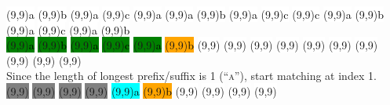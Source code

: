 \begin{center}
  \colorbox{white}{\makebox(9,9){\textcolor{black}{a}}}
  \colorbox{white}{\makebox(9,9){\textcolor{black}{b}}}
  \colorbox{white}{\makebox(9,9){\textcolor{black}{a}}}
  \colorbox{white}{\makebox(9,9){\textcolor{black}{c}}}
  \colorbox{white}{\makebox(9,9){\textcolor{black}{a}}}
  \colorbox{white}{\makebox(9,9){\textcolor{black}{a}}}
  \colorbox{white}{\makebox(9,9){\textcolor{black}{b}}}
  \colorbox{white}{\makebox(9,9){\textcolor{black}{a}}}
  \colorbox{white}{\makebox(9,9){\textcolor{black}{c}}}
  \colorbox{white}{\makebox(9,9){\textcolor{black}{c}}}
  \colorbox{white}{\makebox(9,9){\textcolor{black}{a}}}
  \colorbox{white}{\makebox(9,9){\textcolor{black}{b}}}
  \colorbox{white}{\makebox(9,9){\textcolor{black}{a}}}
  \colorbox{white}{\makebox(9,9){\textcolor{black}{c}}}
  \colorbox{white}{\makebox(9,9){\textcolor{black}{a}}}
  \colorbox{white}{\makebox(9,9){\textcolor{black}{b}}}
  \\
  \colorbox{green}{\makebox(9,9){\textcolor{black}{a}}}
  \colorbox{green}{\makebox(9,9){\textcolor{black}{b}}}
  \colorbox{green}{\makebox(9,9){\textcolor{black}{a}}}
  \colorbox{green}{\makebox(9,9){\textcolor{black}{c}}}
  \colorbox{green}{\makebox(9,9){\textcolor{black}{a}}}
  \colorbox{orange}{\makebox(9,9){\textcolor{black}{b}}}
  \colorbox{white}{\makebox(9,9){\textcolor{black}{}}}
  \colorbox{white}{\makebox(9,9){\textcolor{black}{}}}
  \colorbox{white}{\makebox(9,9){\textcolor{black}{}}}
  \colorbox{white}{\makebox(9,9){\textcolor{black}{}}}
  \colorbox{white}{\makebox(9,9){\textcolor{black}{}}}
  \colorbox{white}{\makebox(9,9){\textcolor{black}{}}}
  \colorbox{white}{\makebox(9,9){\textcolor{black}{}}}
  \colorbox{white}{\makebox(9,9){\textcolor{black}{}}}
  \colorbox{white}{\makebox(9,9){\textcolor{black}{}}}
  \colorbox{white}{\makebox(9,9){\textcolor{black}{}}}
  \\
  Since the length of longest prefix/suffix is 1 (\textsc{``a''}), start matching at index 1.
  \\
  \colorbox{gray}{\makebox(9,9){\textcolor{black}{}}}
  \colorbox{gray}{\makebox(9,9){\textcolor{black}{}}}
  \colorbox{gray}{\makebox(9,9){\textcolor{black}{}}}
  \colorbox{gray}{\makebox(9,9){\textcolor{black}{}}}
  \colorbox{cyan}{\makebox(9,9){\textcolor{black}{a}}}
  \colorbox{orange}{\makebox(9,9){\textcolor{black}{b}}}
  \colorbox{white}{\makebox(9,9){\textcolor{black}{}}}
  \colorbox{white}{\makebox(9,9){\textcolor{black}{}}}
  \colorbox{white}{\makebox(9,9){\textcolor{black}{}}}
  \colorbox{white}{\makebox(9,9){\textcolor{black}{}}}

\end{center}
